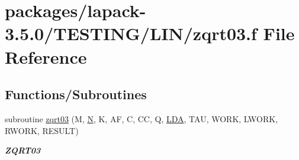 \hypertarget{zqrt03_8f}{}\section{packages/lapack-\/3.5.0/\+T\+E\+S\+T\+I\+N\+G/\+L\+I\+N/zqrt03.f File Reference}
\label{zqrt03_8f}
\subsection*{Functions/\+Subroutines}
\begin{DoxyCompactItemize}
\item 
subroutine \hyperlink{group__complex16__lin_ga5a62f7cf4b997a1b2ecdc6d0c91dda86}{zqrt03} (M, \hyperlink{polmisc_8c_a0240ac851181b84ac374872dc5434ee4}{N}, K, A\+F, C, C\+C, Q, \hyperlink{example__user_8c_ae946da542ce0db94dced19b2ecefd1aa}{L\+D\+A}, T\+A\+U, W\+O\+R\+K, L\+W\+O\+R\+K, R\+W\+O\+R\+K, R\+E\+S\+U\+L\+T)
\begin{DoxyCompactList}\small\item\em {\bfseries Z\+Q\+R\+T03} \end{DoxyCompactList}\end{DoxyCompactItemize}
